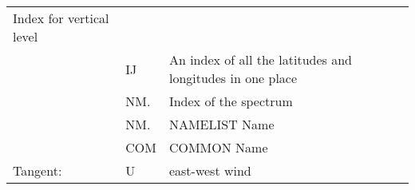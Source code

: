 \begin{longtable}[]{@{}lll@{}}
\begin{minipage}[t]{0.30\columnwidth}
Index for vertical level\strut
\end{minipage}\tabularnewline
\begin{minipage}[t]{0.30\columnwidth}\raggedright
\strut
\end{minipage} & \begin{minipage}[t]{0.30\columnwidth}\raggedright
IJ\strut
\end{minipage} & \begin{minipage}[t]{0.30\columnwidth}\raggedright
An index of all the latitudes and longitudes in one place\strut
\end{minipage}\tabularnewline
\begin{minipage}[t]{0.30\columnwidth}\raggedright
\strut
\end{minipage} & \begin{minipage}[t]{0.30\columnwidth}\raggedright
NM.\strut
\end{minipage} & \begin{minipage}[t]{0.30\columnwidth}\raggedright
Index of the spectrum\strut
\end{minipage}\tabularnewline
\begin{minipage}[t]{0.30\columnwidth}\raggedright
\strut
\end{minipage} & \begin{minipage}[t]{0.30\columnwidth}\raggedright
NM.\strut
\end{minipage} & \begin{minipage}[t]{0.30\columnwidth}\raggedright
NAMELIST Name\strut
\end{minipage}\tabularnewline
\begin{minipage}[t]{0.30\columnwidth}\raggedright
\strut
\end{minipage} & \begin{minipage}[t]{0.30\columnwidth}\raggedright
COM\strut
\end{minipage} & \begin{minipage}[t]{0.30\columnwidth}\raggedright
COMMON Name\strut
\end{minipage}\tabularnewline
\begin{minipage}[t]{0.30\columnwidth}\raggedright
Tangent:\strut
\end{minipage} & \begin{minipage}[t]{0.30\columnwidth}\raggedright
U\strut
\end{minipage} & \begin{minipage}[t]{0.30\columnwidth}\raggedright
east-west wind\strut
\end{minipage}\tabularnewline

\end{longtable}
